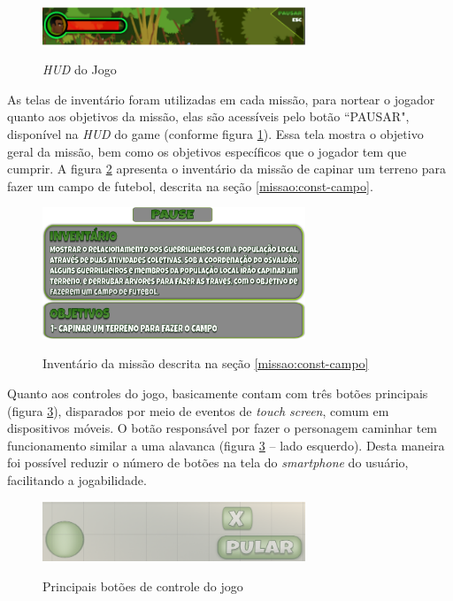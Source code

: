 \begin{figure}[H]
	\centering
	\caption{\textit{HUD} do Jogo}
	\includegraphics[width=0.7\textwidth]{figuras/hud_jogo.png}
	\label{fig:hud-jogo}
	{}
\end{figure}

As telas de inventário foram utilizadas em cada missão, para nortear o jogador quanto aos objetivos da missão, elas são acessíveis pelo botão ``PAUSAR", disponível na \textit{HUD} do game (conforme figura \ref{fig:hud-jogo}). Essa tela mostra o objetivo geral da missão, bem como os objetivos específicos que o jogador tem que cumprir. A figura \ref{fig:invent-miss1} apresenta o inventário da missão de capinar um terreno para fazer um campo de futebol, descrita na seção \ref{missao:const-campo}.

\begin{figure}[H]
	\centering
	\caption{Inventário da missão descrita na seção \ref{missao:const-campo}}
	\includegraphics[width=0.7\textwidth]{figuras/inventario_miss1.png}
	\label{fig:invent-miss1}
	{}
\end{figure}

Quanto aos controles do jogo, basicamente contam com três botões principais (figura \ref{fig:botoes-jogo}), disparados por meio de eventos de \textit{touch screen}, comum em dispositivos móveis. O botão responsável por fazer o personagem caminhar tem funcionamento similar a uma alavanca (figura \ref{fig:botoes-jogo} – lado esquerdo). Desta maneira foi possível reduzir o número de botões na tela do \textit{smartphone} do usuário, facilitando a jogabilidade.

\begin{figure}[H]
	\centering
	\caption{Principais botões de controle do jogo}
	\includegraphics[width=0.7\textwidth]{figuras/botoes_jogo.png}
	\label{fig:botoes-jogo}
	{}
\end{figure}

